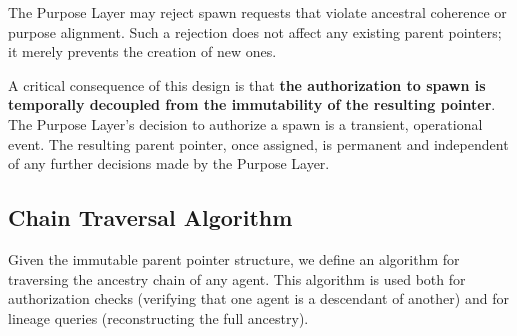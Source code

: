The Purpose Layer may reject spawn requests that violate ancestral coherence or purpose alignment. Such a rejection does not affect any existing parent pointers; it merely prevents the creation of new ones.

A critical consequence of this design is that \textbf{the authorization to spawn is temporally decoupled from the immutability of the resulting pointer}. The Purpose Layer's decision to authorize a spawn is a transient, operational event. The resulting parent pointer, once assigned, is permanent and independent of any further decisions made by the Purpose Layer.

\subsection{Chain Traversal Algorithm}

Given the immutable parent pointer structure, we define an algorithm for traversing the ancestry chain of any agent. This algorithm is used both for authorization checks (verifying that one agent is a descendant of another) and for lineage queries (reconstructing the full ancestry).

